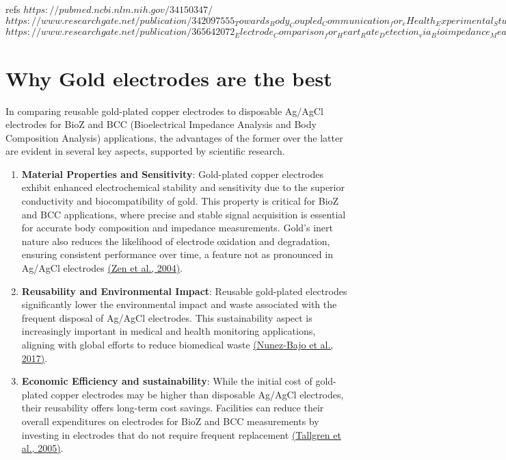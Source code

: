 refs{
$https://pubmed.ncbi.nlm.nih.gov/34150347/$
$https://www.researchgate.net/publication/342097555_Towards_Body_Coupled_Communication_for_eHealth_Experimental_Study_of_Human_Body_Frequency_Response$
$https://www.researchgate.net/publication/365642072_Electrode_Comparison_for_Heart_Rate_Detection_via_Bioimpedance_Measurements$}



\section{Why Gold electrodes are the best}
{
In comparing reusable gold-plated copper electrodes to disposable Ag/AgCl electrodes for BioZ and BCC (Bioelectrical Impedance Analysis and Body Composition Analysis) applications, the advantages of the former over the latter are evident in several key aspects, supported by scientific research.

\begin{enumerate}
    \item \textbf{Material Properties and Sensitivity}: Gold-plated copper electrodes exhibit enhanced electrochemical stability and sensitivity due to the superior conductivity and biocompatibility of gold. This property is critical for BioZ and BCC applications, where precise and stable signal acquisition is essential for accurate body composition and impedance measurements. Gold's inert nature also reduces the likelihood of electrode oxidation and degradation, ensuring consistent performance over time, a feature not as pronounced in Ag/AgCl electrodes \href{https://consensus.app/papers/amino-acid-analysis-using-copper-nanoparticle-plated-zen/95f4e51b52de5e0081608398a7922a14/?utm_source=chatgpt}{(Zen et al., 2004)}.

    \item \textbf{Reusability and Environmental Impact}: Reusable gold-plated electrodes significantly lower the environmental impact and waste associated with the frequent disposal of Ag/AgCl electrodes. This sustainability aspect is increasingly important in medical and health monitoring applications, aligning with global efforts to reduce biomedical waste \href{https://consensus.app/papers/integration-goldsputtered-paper-wireincluded-platforms-nunezbajo/6a42988eac995424b7ba7ccdeef73c27/?utm_source=chatgpt}{(Nunez-Bajo et al., 2017)}.

    \item \textbf{Economic Efficiency and sustainability}: While the initial cost of gold-plated copper electrodes may be higher than disposable Ag/AgCl electrodes, their reusability offers long-term cost savings. Facilities can reduce their overall expenditures on electrodes for BioZ and BCC measurements by investing in electrodes that do not require frequent replacement \href{https://consensus.app/papers/evaluation-commercially-electrodes-gels-recording-tallgren/f57cbd289dfc530d8783f6145a196370/?utm_source=chatgpt}{(Tallgren et al., 2005)}.


\end{enumerate}}
